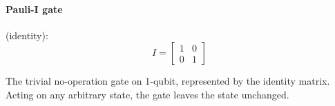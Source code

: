 \paragraph{Pauli-I gate} (identity):
\[
I = \begin{bmatrix}1 & 0 \\ 0 & 1 \end{bmatrix}
\]
\begin{center}

\end{center}
The trivial no-operation gate on 1-qubit, represented by the identity matrix. Acting on any arbitrary state, the gate leaves the state unchanged.%
%
%
%
%
%    
%
%

